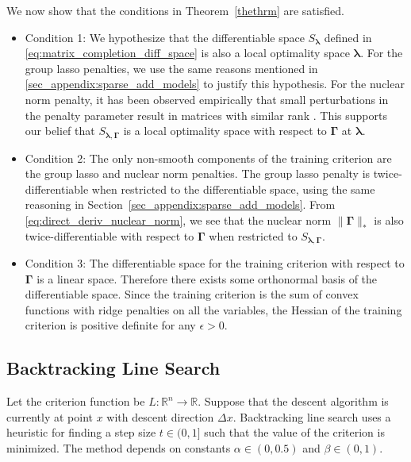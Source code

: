 \documentclass[12pt,letterpaper]{article}
\begin{document}
We now show that the conditions in Theorem~\ref{thethrm} are satisfied.
\begin{itemize}
	\item[] Condition 1: We hypothesize that the differentiable space $S_{\boldsymbol{\lambda}}$ defined in \eqref{eq:matrix_completion_diff_space} is also a local optimality space $\boldsymbol{\lambda}$. For the group lasso penalties, we use the same reasons mentioned in \ref{sec_appendix:sparse_add_models} to justify this hypothesis. For the nuclear norm penalty, it has been observed empirically that small perturbations in the penalty parameter result in matrices with similar rank \citep{mazumder2010spectral}. This supports our belief that $S_{\boldsymbol{\lambda}, \boldsymbol{\Gamma}}$ is a local optimality space with respect to $\boldsymbol{\Gamma}$ at $\boldsymbol{\lambda}$.
	\item[] Condition 2: The only non-smooth components of the training criterion are the group lasso and nuclear norm penalties. The group lasso penalty is twice-differentiable when restricted to the differentiable space, using the same reasoning in Section~\ref{sec_appendix:sparse_add_models}. From \eqref{eq:direct_deriv_nuclear_norm}, we see that the nuclear norm $\|\boldsymbol{\Gamma}\|_{*}$ is also twice-differentiable with respect to $\boldsymbol{\Gamma}$ when restricted to $S_{\boldsymbol{\lambda}, \boldsymbol{\Gamma}}$.
	\hfill {}
	\item[] Condition 3: The differentiable space for the training criterion with respect to $\boldsymbol{\Gamma}$ is a linear space. Therefore there exists some orthonormal basis of the differentiable space. Since the training criterion is the sum of convex functions with ridge penalties on all the variables, the Hessian of the training criterion is positive definite for any $\epsilon > 0$.
	\hfill {}
\end{itemize}

\subsection{Backtracking Line Search}

Let the criterion function be $L:\mathbb{R}^n \rightarrow \mathbb{R}$. Suppose that the descent algorithm is currently at point $x$ with descent direction $\Delta x$. Backtracking line search uses a heuristic for finding a step size $t \in (0,1]$ such that the value of the criterion is minimized. The method depends on constants $\alpha  \in (0, 0.5)$ and $\beta \in (0,1)$.
\end{document}
